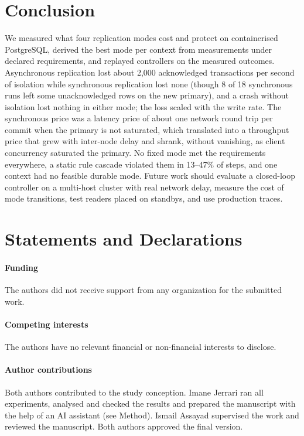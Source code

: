 \documentclass[smallextended]{svjour3}
\begin{document}
\section{Conclusion}\label{sec:conclusion}
We measured what four replication modes cost and protect on containerised PostgreSQL, derived the best mode per context from measurements under declared requirements, and replayed controllers on the measured outcomes. Asynchronous replication lost about 2,000 acknowledged transactions per second of isolation while synchronous replication lost none (though 8 of 18 synchronous runs left some unacknowledged rows on the new primary), and a crash without isolation lost nothing in either mode; the loss scaled with the write rate. The synchronous price was a latency price of about one network round trip per commit when the primary is not saturated, which translated into a throughput price that grew with inter-node delay and shrank, without vanishing, as client concurrency saturated the primary. No fixed mode met the requirements everywhere, a static rule cascade violated them in 13--47\% of steps, and one context had no feasible durable mode. Future work should evaluate a closed-loop controller on a multi-host cluster with real network delay, measure the cost of mode transitions, test readers placed on standbys, and use production traces.

\section*{Statements and Declarations}
\paragraph{Funding} The authors did not receive support from any organization for the submitted work.
\paragraph{Competing interests} The authors have no relevant financial or non-financial interests to disclose.
\paragraph{Author contributions} Both authors contributed to the study conception. Imane Jerrari ran all experiments, analysed and checked the results and prepared the manuscript with the help of an AI assistant (see Method). Ismail Assayad supervised the work and reviewed the manuscript. Both authors approved the final version.
\end{document}
